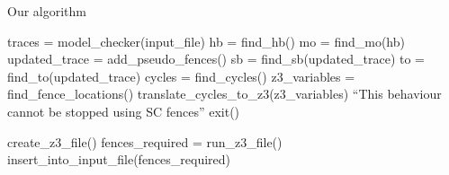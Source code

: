 \begin{algorithm}
\caption{Our algorithm}
\begin{algorithmic}[1]

    \State traces = model\_checker(input\_file)
    	\State hb = find\_hb()
		\State mo = find\_mo(hb)
		\State updated\_trace = add\_pseudo\_fences()
		\State sb = find\_sb(updated\_trace)
		\State to = find\_to(updated\_trace)
		\State cycles = find\_cycles()
    	 
        	\State z3\_variables = find\_fence\_locations()
	        \State translate\_cycles\_to\_z3(z3\_variables)
        \Else
    	    \State ``This behaviour cannot be stopped using SC fences''
			\State exit()
        \EndIf
    \EndFor
    
    \State create\_z3\_file()
	\State fences\_required = run\_z3\_file()
	\State insert\_into\_input\_file(fences\_required)
\EndProcedure

\end{algorithmic}
\end{algorithm}